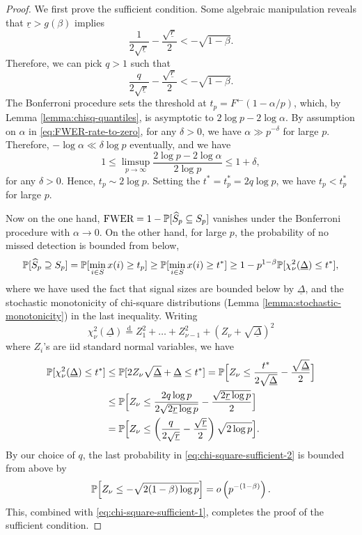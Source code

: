 \begin{proof}
We first prove the sufficient condition.
Some algebraic manipulation reveals that $\underline{r} > {{g}}(\beta)$ implies
$$
\frac{1}{2\sqrt{\underline{r}}} - \frac{\sqrt{\underline{r}}}{2} < -\sqrt{1-\beta}.
$$
Therefore, we can pick $q>1$ such that 
$$
\frac{q}{2\sqrt{\underline{r}}} - \frac{\sqrt{\underline{r}}}{2} < -\sqrt{1-\beta}.
$$
The Bonferroni procedure sets the threshold at $t_p = F^\leftarrow(1-\alpha/p)$, which, by Lemma \ref{lemma:chisq-quantiles}, is asymptotic to $2\log{p} - 2\log{\alpha}$.
By assumption on $\alpha$ in \eqref{eq:FWER-rate-to-zero}, for any $\delta>0$, we have $\alpha\gg p^{-\delta}$ for large $p$.
Therefore, $-\log\alpha\ll\delta\log{p}$ eventually, and we have
$$
1 \le \limsup_{p\to\infty}\frac{2\log{p} - 2\log{\alpha}}{2\log{p}} \le 1+\delta,
$$
for any $\delta>0$.
Hence, $t_p\sim 2\log{p}$.
Setting the $t^* = t^*_p = 2q\log{p}$, we have $t_p < t^*_p$ for large $p$.


Now on the one hand, $\text{FWER} = 1 - \P[\widehat{S}_p \subseteq S_p]$ vanishes under the Bonferroni procedure with $\alpha\to0$.
On the other hand, for large $p$, the probability of no missed detection is bounded from below,
\begin{equation} \label{eq:chi-square-sufficient-1}
    \P[\widehat{S}_p \supseteq S_p] 
    = \P[\min_{i\in S} x(i) \ge t_p] 
    \ge \P[\min_{i\in S} x(i) \ge t^*] 
    \ge 1 - p^{1-\beta}\P[\chi_\nu^2(\underline{\Delta}) \le t^*],
\end{equation}
where we have used the fact that signal sizes are bounded below by $\underline{\Delta}$, and the stochastic monotonicity of chi-square distributions (Lemma \ref{lemma:stochastic-monotonicity}) in the last inequality.
Writing
$$
\chi_\nu^2(\underline{\Delta}) \stackrel{\mathrm{d}}{=} Z_1^2 + \ldots + Z_{\nu-1}^2 + (Z_\nu + \sqrt{\underline{\Delta}})^2
$$
where $Z_i$'s are iid standard normal variables, we have
\begin{align}
    \P[\chi_\nu^2({\underline{\Delta}}) \le t^*]
    &\le \P[2Z_\nu\sqrt{\underline{\Delta}} + \underline{\Delta} \le t^*] 
    = \P\Big[Z_\nu \le \frac{t^*}{2\sqrt{\underline{\Delta}}} - \frac{\sqrt{\underline{\Delta}}}{2}\Big] \nonumber \\
    &\le \P\Big[Z_\nu \le \frac{2q\log{p}}{2\sqrt{2\underline{r}\log{p}}} - \frac{\sqrt{2\underline{r}\log{p}}}{2}\Big] \nonumber \\
    &= \P\Big[Z_\nu \le \left(\frac{q}{2\sqrt{\underline{r}}} - \frac{\sqrt{\underline{r}}}{2}\right)\sqrt{2\log{p}}\Big]. \label{eq:chi-square-sufficient-2}
\end{align}
By our choice of $q$, the last probability in \eqref{eq:chi-square-sufficient-2}
is bounded from above by 
$$
\P\Big[Z_\nu \le -\sqrt{2(1-\beta)\log{p}}\Big] = o\left(p^{-(1-\beta)}\right).
$$
This, combined with \eqref{eq:chi-square-sufficient-1}, completes the proof of the sufficient condition.


\end{proof}
